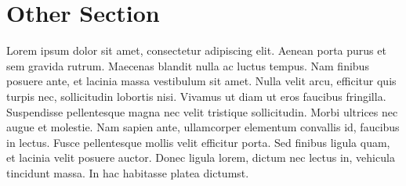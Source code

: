 \documentclass[11pt]{article}
\begin{document}

\section{Other Section}

Lorem ipsum dolor sit amet, consectetur adipiscing elit.
Aenean porta purus et sem gravida rutrum.
Maecenas blandit nulla ac luctus tempus.
Nam finibus posuere ante, et lacinia massa vestibulum sit amet.
Nulla velit arcu, efficitur quis turpis nec, sollicitudin lobortis nisi.
Vivamus ut diam ut eros faucibus fringilla.
Suspendisse pellentesque magna nec velit tristique sollicitudin.
Morbi ultrices nec augue et molestie.
Nam sapien ante, ullamcorper elementum convallis id, faucibus in lectus.
Fusce pellentesque mollis velit efficitur porta.
Sed finibus ligula quam, et lacinia velit posuere auctor.
Donec ligula lorem, dictum nec lectus in, vehicula tincidunt massa.
In hac habitasse platea dictumst.


\printbibliography[heading=bibintoc]

\end{document}
